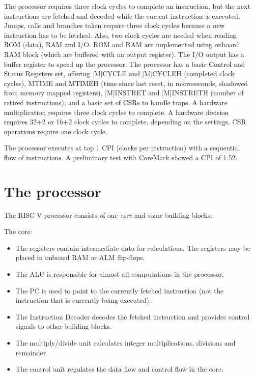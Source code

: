 \documentclass[12pt]{article}
\begin{document}
The processor requires three clock cycles to complete an instruction, but the next instructions are fetched and decoded while the current instruction is executed. Jumps, calls and branches taken require three clock cycles because a new instruction has to be fetched. Also, two clock cycles are needed when reading ROM (data), RAM and I/O. ROM and RAM are implemented using onboard RAM block (which are buffered with an output register). The I/O output has a buffer register to speed up the processor. The processor has a basic Control and Status Registers set, offering [M]CYCLE and [M]CYCLEH (completed clock cycles), MTIME and MTIMEH (time since last reset, in microseconds, shadowed from memory mapped registers), [M]INSTRET and [M]INSTRETH (number of retired instructions), and a basic set of CSRs to handle traps. A hardware multiplication requires three clock cycles to complete. A hardware division requires 32+2 or 16+2 clock cycles to complete, depending on the settings. CSR operations require one clock cycle.

The processor executes at top 1 CPI (clocks per instruction) with a sequential flow of instructions. A preliminary test with CoreMark showed a CPI of 1.52.

\section{The processor}
The RISC-V processor consists of one \textit{core} and some building blocks:

The core:
\begin{itemize}
\item The registers contain intermediate data for calculations. The registers may be placed in onboard RAM or ALM flip-flops.
\item The ALU is responsible for almost all computations in the processor.
\item The PC is used to point to the currently fetched instruction (not the instruction that is currently being executed).
\item The Instruction Decoder decodes the fetched instruction and provides control signals to other building blocks.
\item The multiply/divide unit calculates integer multiplications, divisions and remainder.
\item The control unit regulates the data flow and control flow in the core.
\end{itemize}
\end{document}
